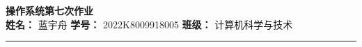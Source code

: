 \newcommand{\Homework}{操作系统第七次作业}
\newcommand{\Name}{蓝宇舟}
\newcommand{\StudentNumber}{2022K8009918005}
\newcommand{\Class}{计算机科学与技术}

\begingroup
    \centering
    \LARGE {\bf \Homework} \\[0.5em]
    \large \textbf{姓名：} \Name \hspace{2em}
           \textbf{学号：} \StudentNumber \hspace{2em}
           \textbf{班级：} \Class \par
\endgroup
\rule{\textwidth}{0.4pt}
\printanswers
